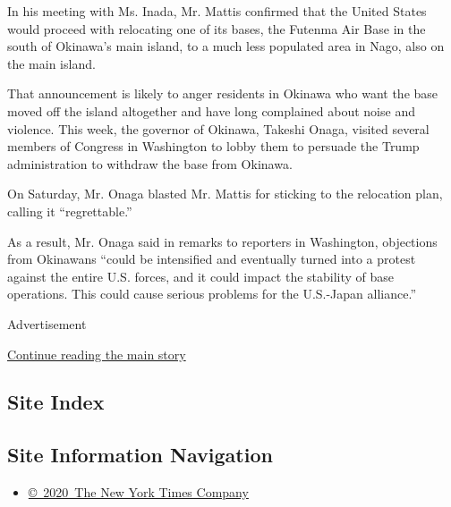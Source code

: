 In his meeting with Ms. Inada, Mr. Mattis confirmed that the United
States would proceed with relocating one of its bases, the Futenma Air
Base in the south of Okinawa's main island, to a much less populated
area in Nago, also on the main island.

That announcement is likely to anger residents in Okinawa who want the
base moved off the island altogether and have long complained about
noise and violence. This week, the governor of Okinawa, Takeshi Onaga,
visited several members of Congress in Washington to lobby them to
persuade the Trump administration to withdraw the base from Okinawa.

On Saturday, Mr. Onaga blasted Mr. Mattis for sticking to the relocation
plan, calling it ``regrettable.''

As a result, Mr. Onaga said in remarks to reporters in Washington,
objections from Okinawans ``could be intensified and eventually turned
into a protest against the entire U.S. forces, and it could impact the
stability of base operations. This could cause serious problems for the
U.S.-Japan alliance.''

Advertisement

\protect\hyperlink{after-bottom}{Continue reading the main story}

\hypertarget{site-index}{%
\subsection{Site Index}\label{site-index}}

\hypertarget{site-information-navigation}{%
\subsection{Site Information
Navigation}\label{site-information-navigation}}

\begin{itemize}
\tightlist
\item
  \href{https://help.nytimes.com/hc/en-us/articles/115014792127-Copyright-notice}{©~2020~The
  New York Times Company}
\end{itemize}

